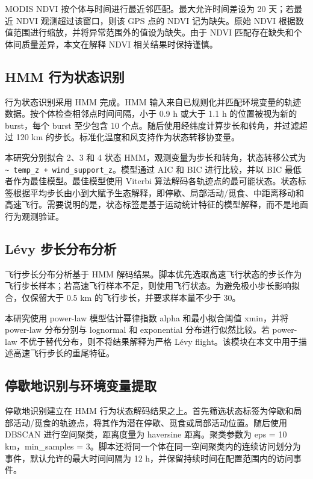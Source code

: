 \documentclass[UTF8,a4paper,12pt]{ctexart}
\begin{document}
MODIS NDVI 按个体与时间进行最近邻匹配。最大允许时间差设为 20 天；若最近 NDVI 观测超过该窗口，则该 GPS 点的 NDVI 记为缺失。原始 NDVI 根据数值范围进行缩放，并将异常范围外的值设为缺失。由于 NDVI 匹配存在缺失和个体间质量差异，本文在解释 NDVI 相关结果时保持谨慎。

\subsection{HMM 行为状态识别}

行为状态识别采用 HMM 完成。HMM 输入来自已规则化并匹配环境变量的轨迹数据。按个体检查相邻点时间间隔，小于 0.9 h 或大于 1.1 h 的位置被视为新的 burst，每个 burst 至少包含 10 个点。随后使用经纬度计算步长和转角，并过滤超过 120 km 的步长。标准化温度和风支持作为状态转移协变量。

本研究分别拟合 2、3 和 4 状态 HMM，观测变量为步长和转角，状态转移公式为 \texttt{\textasciitilde{} temp\_z + wind\_support\_z}。模型通过 AIC 和 BIC 进行比较，并以 BIC 最低者作为最佳模型。最佳模型使用 Viterbi 算法解码各轨迹点的最可能状态。状态标签根据平均步长由小到大赋予生态解释，即停歇、局部活动/觅食、中距离移动和高速飞行。需要说明的是，状态标签是基于运动统计特征的模型解释，而不是地面行为观测验证。

\subsection{L\'evy 步长分布分析}

飞行步长分布分析基于 HMM 解码结果。脚本优先选取高速飞行状态的步长作为飞行步长样本；若高速飞行样本不足，则使用飞行状态。为避免极小步长影响拟合，仅保留大于 0.5 km 的飞行步长，并要求样本量不少于 30。

本研究使用 power-law 模型估计幂律指数 alpha 和最小拟合阈值 xmin，并将 power-law 分布分别与 lognormal 和 exponential 分布进行似然比较。若 power-law 不优于替代分布，则不将结果解释为严格 L\'evy flight。该模块在本文中用于描述高速飞行步长的重尾特征。

\subsection{停歇地识别与环境变量提取}

停歇地识别建立在 HMM 行为状态解码结果之上。首先筛选状态标签为停歇和局部活动/觅食的轨迹点，将其作为潜在停歇、觅食或局部活动位置。随后使用 DBSCAN 进行空间聚类，距离度量为 haversine 距离。聚类参数为 eps = 10 km，min\_samples = 3。脚本还将同一个体在同一空间聚类内的连续访问划分为事件，默认允许的最大时间间隔为 12 h，并保留持续时间在配置范围内的访问事件。
\end{document}
